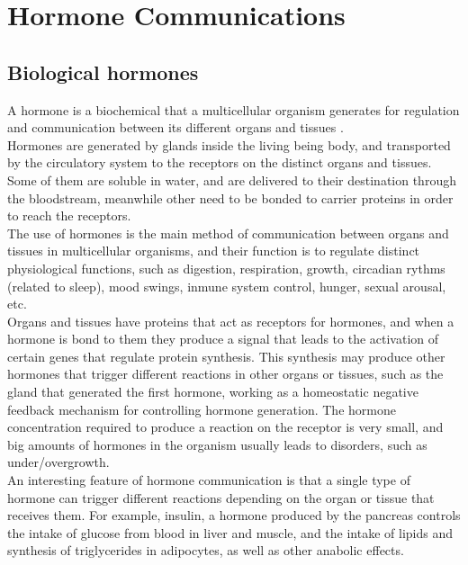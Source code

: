 \chapter{Hormone Communications}
\label{hormones}

\nocite{Salemi2001}

\section{Biological hormones}
\label{bio_hormones}

A hormone is a biochemical that a multicellular organism generates for regulation and communication between its different organs and tissues \cite{hormones_wikipedia}.\\

Hormones are generated by glands inside the living being body, and transported by the circulatory system to the receptors on the distinct organs and tissues. Some of them are soluble in water, and are delivered to their destination through the bloodstream, meanwhile other need to be bonded to carrier proteins in order to reach the receptors.\\

The use of hormones is the main method of communication between organs and tissues in multicellular organisms, and their function is to regulate distinct physiological functions, such as digestion, respiration, growth, circadian rythms (related to sleep), mood swings, inmune system control, hunger, sexual arousal, etc.\\

Organs and tissues have proteins that act as receptors for hormones, and when a hormone is bond to them they produce a signal that leads to the activation of certain genes that regulate protein synthesis. This synthesis may produce other hormones that trigger different reactions in other organs or tissues, such as the gland that generated the first hormone, working as a homeostatic negative feedback mechanism for controlling hormone generation. The hormone concentration required to produce a reaction on the receptor is very small, and big amounts of hormones in the organism usually leads to disorders, such as under/overgrowth.\\

An interesting feature of hormone communication is that a single type of hormone can trigger different reactions depending on the organ or tissue that receives them. For example, insulin, a hormone produced by the pancreas controls the intake of glucose from blood in liver and muscle, and the intake of lipids and synthesis of triglycerides in adipocytes, as well as other anabolic effects. \\

